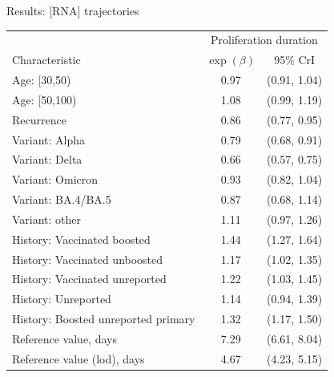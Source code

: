 \documentclass[9pt, aspectratio=169]{beamer}
\begin{document}
\begin{frame}{Results: [RNA] trajectories}
   \begin{table}[]
       \centering
       \begin{tabular}{lcc}
        \toprule
        & \multicolumn{2}{c}{Proliferation duration } \\
        Characteristic & $\exp(\beta)$ & 95\% CrI\\
        \midrule
        Age: [30,50) & 0.97 & (0.91, 1.04)\\
        Age: [50,100) & 1.08 & (0.99, 1.19)\\
        Recurrence & 0.86 & (0.77, 0.95)\\
        Variant: Alpha & 0.79 & (0.68, 0.91)\\
        Variant: Delta & 0.66 & (0.57, 0.75)\\
        Variant: Omicron & 0.93 & (0.82, 1.04)\\
        Variant: BA.4/BA.5 & 0.87 & (0.68, 1.14)\\
        Variant: other & 1.11 & (0.97, 1.26)\\
        History: Vaccinated boosted & 1.44 & (1.27, 1.64)\\
        History: Vaccinated unboosted & 1.17 & (1.02, 1.35)\\
        History: Vaccinated unreported & 1.22 & (1.03, 1.45)\\
        History: Unreported & 1.14 & (0.94, 1.39)\\
        History: Boosted unreported primary & 1.32 & (1.17, 1.50)\\
        \midrule
        Reference value, days & 7.29 & (6.61, 8.04)\\
        Reference value (lod), days & 4.67 & (4.23, 5.15)\\
        \bottomrule
        \end{tabular}
\   \end{table}
\end{frame}
\end{document}
